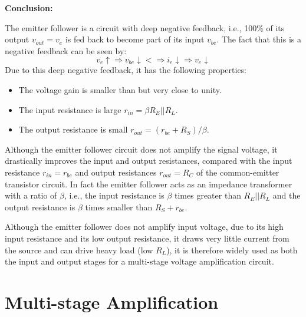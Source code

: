 {\bf Conclusion:} 

The emitter follower is a circuit with deep negative feedback, i.e., 
100\% of its output $v_{out}=v_e$ is fed back to become part of its input 
$v_{be}$. The fact that this is a negative feedback can be seen by:
\[ 
v_e \uparrow \Longrightarrow v_{be} \downarrow
<\Longrightarrow i_e \downarrow \Longrightarrow v_e \downarrow 
\]
Due to this deep negative feedback, it has the following properties:
\begin{itemize}
\item The voltage gain is smaller than but very close to unity. 
\item The input resistance is large $r_{in}=\beta R_E||R_L$.
\item The output resistance is small $r_{out}=(r_{be}+R_S)/\beta$.
\end{itemize}

Although the emitter follower circuit does not amplify the signal voltage, 
it drastically improves the input and output resistances, compared with 
the input resistance $r_{in}=r_{be}$ and output resistances $r_{out}=R_C$ of 
the common-emitter transistor circuit. In fact the emitter follower acts 
as an impedance transformer with a ratio of $\beta$, i.e., the input 
resistance is $\beta$ times greater than $R_E||R_L$ and the output 
resistance is $\beta$ times smaller than $R_S+r_{be}$. 

Although the emitter follower does not amplify input voltage, due to its 
high input resistance and its low output resistance, it draws very little 
current from the source and can drive heavy load (low $R_L$), it is therefore
widely used as both the input and output stages for a multi-stage voltage 
amplification circuit.

\section*{Multi-stage Amplification}

